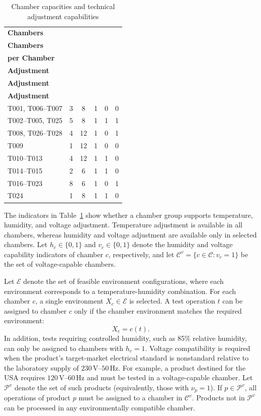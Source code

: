 \documentclass[11pt]{article}
\begin{document}
\begin{table}[H]
\centering
\caption{Chamber capacities and technical adjustment capabilities}
\label{tab:chamber_capabilities}
\small
\setlength{\tabcolsep}{5pt}
\renewcommand{\arraystretch}{1.12}
\begin{tabular}{lccccc}
\hline
\textbf{Chambers} &
\shortstack{\textbf{No. of}\\\textbf{Chambers}} &
\shortstack{\textbf{Stations}\\\textbf{per Chamber}} &
\shortstack{\textbf{Temperature}\\\textbf{Adjustment}} &
\shortstack{\textbf{Humidity}\\\textbf{Adjustment}} &
\shortstack{\textbf{Voltage}\\\textbf{Adjustment}} \\
\hline
T001, T006--T007 & 3 & 8  & 1 & 0 & 0 \\
T002--T005, T025 & 5 & 8  & 1 & 1 & 1 \\
T008, T026--T028 & 4 & 12 & 1 & 0 & 1 \\
T009              & 1 & 12 & 1 & 0 & 0 \\
T010--T013        & 4 & 12 & 1 & 1 & 0 \\
T014--T015        & 2 & 6  & 1 & 1 & 0 \\
T016--T023        & 8 & 6  & 1 & 0 & 1 \\
T024              & 1 & 8  & 1 & 1 & 0 \\
\hline
\end{tabular}
\end{table}

The indicators in Table~\ref{tab:chamber_capabilities} show whether a chamber group supports temperature, humidity, and voltage adjustment. Temperature adjustment is available in all chambers, whereas humidity and voltage adjustment are available only in selected chambers. Let \(h_c\in\{0,1\}\) and \(v_c\in\{0,1\}\) denote the humidity and voltage capability indicators of chamber \(c\), respectively, and let \(\mathcal{C}^v=\{c\in\mathcal{C}:v_c=1\}\) be the set of voltage-capable chambers.

Let \(\mathcal{E}\) denote the set of feasible environment configurations, where each environment corresponds to a temperature-humidity combination. For each chamber \(c\), a single environment \(X_c\in\mathcal{E}\) is selected. A test operation \(t\) can be assigned to chamber \(c\) only if the chamber environment matches the required environment:
\[
X_c=e(t).
\]
In addition, tests requiring controlled humidity, such as 85\% relative humidity, can only be assigned to chambers with \(h_c=1\). Voltage compatibility is required when the product's target-market electrical standard is nonstandard relative to the laboratory supply of \(230\,\mathrm{V}\)--\(50\,\mathrm{Hz}\). For example, a product destined for the USA requires \(120\,\mathrm{V}\)--\(60\,\mathrm{Hz}\) and must be tested in a voltage-capable chamber. Let \(\mathcal{P}^v\) denote the set of such products (equivalently, those with \(\nu_p=1\)). If \(p\in\mathcal{P}^v\), all operations of product \(p\) must be assigned to a chamber in \(\mathcal{C}^v\). Products not in \(\mathcal{P}^v\) can be processed in any environmentally compatible chamber.
\end{document}

